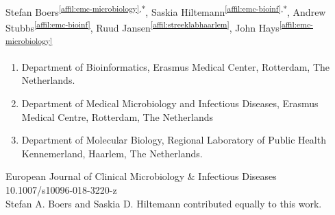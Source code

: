 \setcounter{figure}{-1}
\setcounter{table}{-1}
\setcounter{section}{-1}
\setcounter{NAT@ctr}{-1}

Stefan Boers\textsuperscript{\ref{affil:emc-microbiology},*},
Saskia Hiltemann\textsuperscript{\ref{affil:emc-bioinf},*},
Andrew Stubbs\textsuperscript{\ref{affil:emc-bioinf}},
Ruud Jansen\textsuperscript{\ref{affil:streeklabhaarlem}},
John Hays\textsuperscript{\ref{affil:emc-microbiology}}

\small
\begin{enumerate}
\itemsep-0.5em
\item Department of Bioinformatics, Erasmus Medical Center, Rotterdam, The Netherlands. \label{affil:emc-bioinf}
\item Department of Medical Microbiology and Infectious Diseases, Erasmus Medical Centre, Rotterdam, The Netherlands \label{affil:emc-microbiology}
\item Department of Molecular Biology, Regional Laboratory of Public Health Kennemerland, Haarlem, The Netherlands. \label{affil:streeklabhaarlem}
\end{enumerate}

{\color{chaptergrey}{Published in:}} European Journal of Clinical Microbiology \& Infectious Diseases \\
{\color{chaptergrey}{DOI:}} 10.1007/s10096-018-3220-z \\
{\color{chaptergrey}{*:}} Stefan A. Boers and Saskia D. Hiltemann contributed equally to this work.

\normalsize

